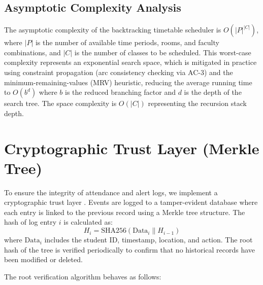 \documentclass[12pt,a4paper,oneside]{report}
\begin{document}
\subsection{Asymptotic Complexity Analysis}
The asymptotic complexity of the backtracking timetable scheduler is $O(|P|^{|C|})$, where $|P|$ is the number of available time periods, rooms, and faculty combinations, and $|C|$ is the number of classes to be scheduled. This worst-case complexity represents an exponential search space, which is mitigated in practice using constraint propagation (arc consistency checking via AC-3) and the minimum-remaining-values (MRV) heuristic, reducing the average running time to $O(b^d)$ where $b$ is the reduced branching factor and $d$ is the depth of the search tree. The space complexity is $O(|C|)$ representing the recursion stack depth.

\section{Cryptographic Trust Layer (Merkle Tree)}
To ensure the integrity of attendance and alert logs, we implement a cryptographic trust layer \cite{haber1991proving}. Events are logged to a tamper-evident database where each entry is linked to the previous record using a Merkle tree structure. The hash of log entry $i$ is calculated as:
\begin{equation}
    H_i = \text{SHA256}\left( \text{Data}_i \parallel H_{i-1} \right)
\end{equation}
where $\text{Data}_i$ includes the student ID, timestamp, location, and action. The root hash of the tree is verified periodically to confirm that no historical records have been modified or deleted.

The root verification algorithm behaves as follows:
\end{document}
